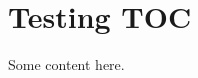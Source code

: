 \documentclass[a4paper, 12pt]{report}
\begin{document}
\tableofcontents
\chapter{Testing TOC}
Some content here.
\end{document}
